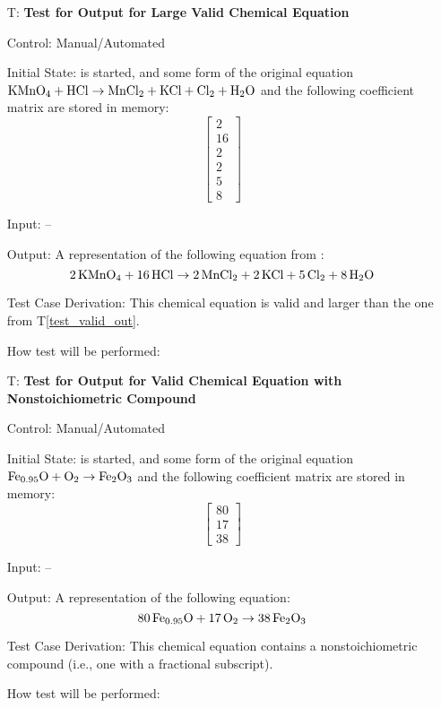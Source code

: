 \documentclass[12pt, titlepage]{article}
\newcounter{testnum} %
\newcommand{\testref}[1]{T\ref{#1}}
\begin{document}
\begin{enumerate}
  \item[T\refstepcounter{testnum}\thetestnum \label{test_large_valid_out}:]
    \textbf{Test for Output for Large Valid Chemical Equation}

    Control: Manual/Automated 

    Initial State: \progname{} is started, and some form of the original
    equation $\ce{KMnO4} + \ce{HCl} \rightarrow \ce{MnCl2} + \ce{KCl} +
      \ce{Cl2} + \ce{H2O}$ \cite{taylor_balancing_2021} and the following
    coefficient matrix are stored in memory:
    $$\begin{bmatrix}
        2  \\
        16 \\
        2  \\
        2  \\
        5  \\
        8
      \end{bmatrix}$$

    Input: --

    Output: A representation of the following equation from
    \cite{taylor_balancing_2021}:
    $$\ce{2KMnO4} + \ce{16HCl} \rightarrow \ce{2MnCl2} + \ce{2KCl} +
      \ce{5Cl2} + \ce{8H2O}$$


    Test Case Derivation: This chemical equation is
    valid and larger than the one from \testref{test_valid_out}.

    How test will be performed: 

  \item[T\refstepcounter{testnum}\thetestnum \label{test_nonstoich_valid_out}:]
    \textbf{Test for Output for Valid Chemical Equation with
      Nonstoichiometric Compound}

    Control: Manual/Automated 

    Initial State: \progname{} is started, and some form of the original
    equation $\ce{Fe_{0.95}O} + \ce{O2} \rightarrow \ce{Fe2O3}$
    \cite{doubtnut_when_nodate} and the following
    coefficient matrix are stored in memory:
    $$\begin{bmatrix}
        80 \\
        17 \\
        38
      \end{bmatrix}$$

    Input: --

    Output: A representation of the following equation:
    $$\ce{80Fe_{0.95}O} + \ce{17O2} \rightarrow \ce{38Fe2O3}$$

    Test Case Derivation: This chemical equation
    contains a nonstoichiometric compound (i.e., one with a fractional
    subscript).

    How test will be performed: 



\end{enumerate}
\end{document}
